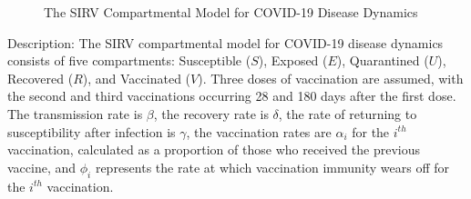\documentclass{article}
\begin{document}
\begin{figure}[h]
    \centering
    \caption{The SIRV Compartmental Model for COVID-19 Disease Dynamics}
    \label{fig:SIRV}
\end{figure}

Description:
The SIRV compartmental model for COVID-19 disease dynamics consists of five compartments: Susceptible ($S$), Exposed ($E$), Quarantined ($U$), Recovered ($R$), and Vaccinated ($V$). Three doses of vaccination are assumed, with the second and third vaccinations occurring 28 and 180 days after the first dose. The transmission rate is $\beta$, the recovery rate is $\delta$, the rate of returning to susceptibility after infection is $\gamma$, the vaccination rates are $\alpha_i$ for the $i^{th}$ vaccination, calculated as a proportion of those who received the previous vaccine, and $\phi_i$ represents the rate at which vaccination immunity wears off for the $i^{th}$ vaccination.
\end{document}
